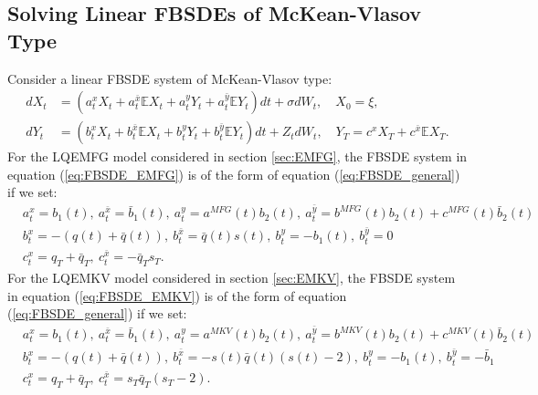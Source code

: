 \documentclass[11pt]{article}
\begin{document}
\begin{appendices}

\section{\textbf{Solving Linear FBSDEs of McKean-Vlasov Type}} \label{appendix_solving_fbsdes}

Consider a linear FBSDE system of McKean-Vlasov type:
\begin{equation}
\begin{split}
        dX_t&=\left(a^x_tX_t+a^{\bar{x}}_t \mathbb{E}X_t+a^y_tY_t+a^{\bar{y}}_t \mathbb{E}Y_t\right)dt+\sigma dW_t, \quad X_0=\xi, \\
        dY_t&=\left(b^x_tX_t+b^{\bar{x}}_t \mathbb{E}X_t+b^y_tY_t+b^{\bar{y}}_t \mathbb{E}Y_t\right)dt +Z_t dW_t, \quad Y_T=c^xX_T+c^{\bar{x}}\mathbb{E}X_T.
\end{split}
\label{eq:FBSDE_general}
\end{equation}
For the LQEMFG model considered in section \ref{sec:EMFG}, the FBSDE system in equation (\ref{eq:FBSDE_EMFG}) is of the form of equation (\ref{eq:FBSDE_general}) if we set:
\begin{equation*}
\begin{split}
    &a^x_t=b_1(t),\ a^{\bar{x}}_t=\bar{b}_1(t),\ a^y_t=a^{MFG}(t)b_2(t),\ a^{\bar{y}}_t=b^{MFG}(t)b_2(t)+c^{MFG}(t)\bar{b}_2(t) \\
    &b^x_t=-(q(t)+\bar{q}(t)),\ b^{\bar{x}}_t=\bar{q}(t)s(t),\ b^y_t=-b_1(t),\ b^{\bar{y}}_t=0 \\
    &c^x_t=q_T+\bar{q}_T,\ c^{\bar{x}}_t=-\bar{q}_Ts_T.
\end{split}
\end{equation*}
For the LQEMKV model considered in section \ref{sec:EMKV}, the FBSDE system in equation (\ref{eq:FBSDE_EMKV}) is of the form of equation (\ref{eq:FBSDE_general}) if we set:
\begin{equation*}
\begin{split}
    &a^x_t=b_1(t),\ a^{\bar{x}}_t=\bar{b}_1(t),\ a^y_t=a^{MKV}(t)b_2(t),\ a^{\bar{y}}_t=b^{MKV}(t)b_2(t)+c^{MKV}(t)\bar{b}_2(t) \\
    &b^x_t=-(q(t)+\bar{q}(t)),\ b^{\bar{x}}_t=-s(t)\bar{q}(t)(s(t)-2),\ b^y_t=-b_1(t),\ b^{\bar{y}}_t=-\bar{b}_1 \\
    &c^x_t=q_T+\bar{q}_T,\ c^{\bar{x}}_t=s_T\bar{q}_T(s_T-2).
\end{split}
\end{equation*}


\end{appendices}
\end{document}
